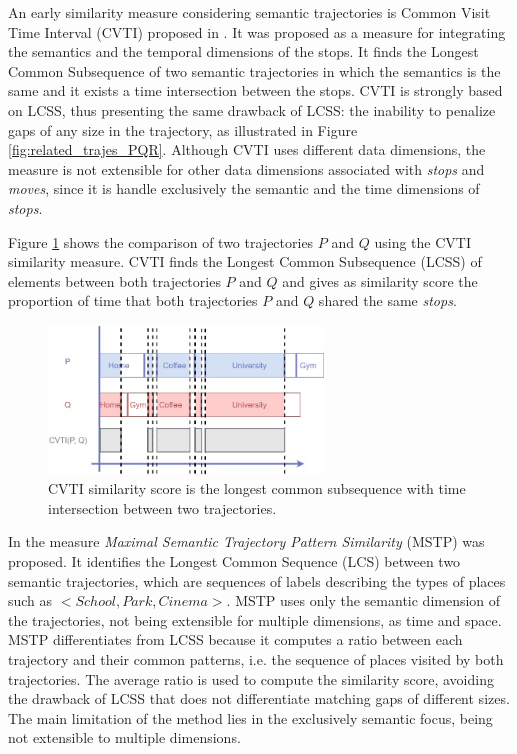 An early similarity measure considering semantic trajectories is Common Visit Time Interval (CVTI) proposed in \cite{Kang:2009:SMT:1529282.1529580}. It was proposed as a measure for integrating the semantics {and the temporal dimensions of the stops}. It finds the Longest Common Subsequence of two semantic trajectories in {which the semantics is the same and it exists a time intersection between the stops}.
CVTI is strongly based on LCSS, thus presenting the same drawback of LCSS: the inability to penalize gaps of any size in the trajectory, as illustrated in Figure \ref{fig:related_trajes_PQR}. Although CVTI uses different data dimensions, the measure is not extensible for other data dimensions associated with \emph{stops} and \emph{moves}{, since it is handle exclusively the semantic and the time dimensions of \emph{stops}}.

Figure \ref{fig:related_trajes_CVTI} shows the comparison of two trajectories $P$ and $Q$ using the CVTI similarity measure. CVTI finds the Longest Common Subsequence (LCSS) of elements between both trajectories $P$ and $Q$ and gives as similarity score the proportion of time that both trajectories $P$ and $Q$ shared the same \emph{stops}.

\begin{figure}[h]
\centering
\includegraphics[width=0.65\textwidth]{Related_Works/Semantic_Trajectories_(CVTI).jpg}
\caption{\label{fig:related_trajes_CVTI}CVTI similarity score is the longest common subsequence with time intersection between two trajectories.}
\end{figure}

In \cite{Ying:2010:MUS:1867699.1867703} the measure \emph{Maximal Semantic Trajectory Pattern Similarity} (MSTP) was proposed. It identifies the Longest Common Sequence (LCS) between two semantic trajectories, which are sequences of labels describing the types of places such as $<School, Park, Cinema>$. {MSTP uses only the semantic dimension of the trajectories, not being extensible for multiple dimensions, as time and space.} MSTP differentiates from LCSS because it computes a ratio between each trajectory and their common patterns, i.e. the sequence of places visited by both trajectories. The average ratio is used to compute the similarity score, avoiding the drawback of LCSS that does not differentiate matching gaps of different sizes. {The main limitation of the method lies in the exclusively semantic focus, being not extensible to multiple dimensions.}

